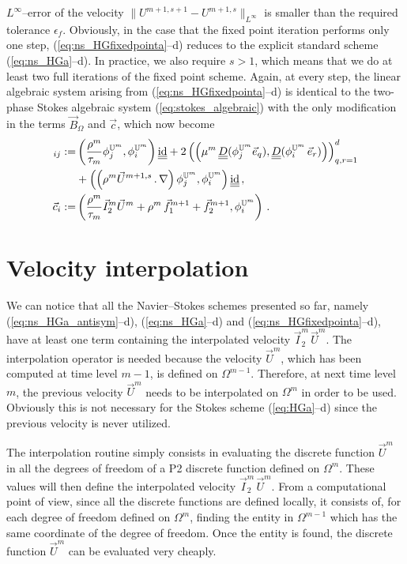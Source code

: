 $L^\infty$--error of the velocity $\|U^{m+1,s+1}-U^{m+1,s} \|_{L^\infty}$ is
smaller than the required tolerance $\epsilon_f$. Obviously, in the case that
the fixed point iteration performs only one step,
(\ref{eq:ns_HGfixedpointa}--d) reduces to the explicit standard scheme
(\ref{eq:ns_HGa}--d). In practice, we also require $s>1$, which means that we
do at least two full iterations of the fixed point scheme. Again, at every
step, the linear algebraic system arising from (\ref{eq:ns_HGfixedpointa}--d)
is identical to the two-phase Stokes algebraic system
(\ref{eq:stokes_algebraic}) with the only modification in the terms
$\vec B_{\Omega}$ and $\vec c$, which now become
\begin{align*}
[\vec B_\Omega]_{ij} := & \left( \frac{\rho^m}{\tau_m} \phi_j^{\uspacesimple^m},
\phi_i^{\uspacesimple^m} \right)\mat \id
+ 2\left(\left(\mu^m\,\mat D(\phi_j^{\uspacesimple^m} \vec e_q),
\mat D(\phi_i^{\uspacesimple^m}\,\vec e_r) \right) \right)_{q,r=1}^d\\
& + \left( \left(\rho^m \vec U^{m+1,s}\,.\,\nabla \right)
\phi_j^{\uspacesimple^m},
\phi_i^{\uspacesimple^m} \right)\mat \id \,,\\
\vec c_i := &\left( \frac{\rho^m}{\tau_m}\vec I_2^m\vec U^m +
\rho^m\,\vec f_1^{m+1}+\vec f_2^{m+1},\phi_i^{\uspacesimple^m}\right)\,.
\end{align*}

\section{Velocity interpolation}\label{sec:ns_velocity_interpolation}
We can notice that all the Navier--Stokes schemes presented so far, namely
(\ref{eq:ns_HGa_antisym}--d), (\ref{eq:ns_HGa}--d) and
(\ref{eq:ns_HGfixedpointa}--d), have at least one term containing the
interpolated velocity $\vec I^m_2\,\vec U^m$. The interpolation operator is
needed because the velocity $\vec U^m$, which has been computed at time level
$m-1$, is defined on $\Omega^{m-1}$. Therefore, at next time level $m$, the
previous velocity $\vec U^m$ needs to be interpolated on $\Omega^m$ in order
to be used. Obviously this is not necessary for the Stokes scheme
(\ref{eq:HGa}--d) since the previous velocity is never utilized.

The interpolation routine simply consists in evaluating the discrete function
$\vec U^m$ in all the degrees of freedom of a P2 discrete function defined on
$\Omega^m$. These values will then define the interpolated velocity
$\vec I^m_2\,\vec U^m$. From a computational point of view, since all the
discrete functions are defined locally, it consists of, for each degree of
freedom defined on $\Omega^m$, finding the entity in $\Omega^{m-1}$ which has
the same coordinate of the degree of freedom. Once the entity is found, the
discrete function $\vec U^m$ can be evaluated very cheaply.


